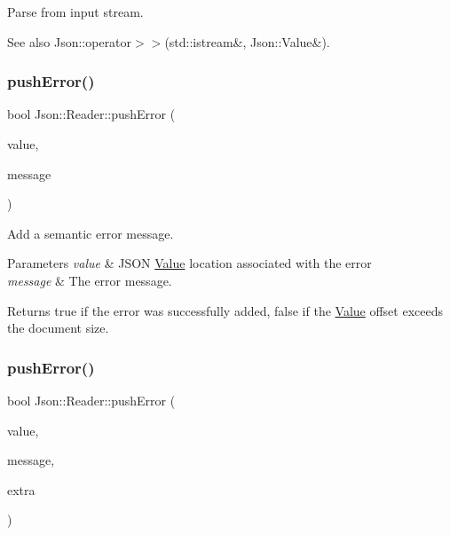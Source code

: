 Parse from input stream. 

\begin{DoxySeeAlso}{See also}
Json\+::operator$>$$>$(std\+::istream\&, Json\+::\+Value\&). 
\end{DoxySeeAlso}
\mbox{\label{classJson_1_1Reader_af5fa7099083f01706635ade1d0f8ddb5}} 
\subsubsection{\texorpdfstring{push\+Error()}{pushError()}\hspace{0.1cm}{\footnotesize\ttfamily [1/2]}}
{\footnotesize\ttfamily bool Json\+::\+Reader\+::push\+Error (\begin{DoxyParamCaption}\item[{const \hyperlink{classJson_1_1Value}{Value} \&}]{value,  }\item[{const J\+S\+O\+N\+C\+P\+P\+\_\+\+S\+T\+R\+I\+NG \&}]{message }\end{DoxyParamCaption})}



Add a semantic error message. 


\begin{DoxyParams}{Parameters}
{\em value} & J\+S\+ON \hyperlink{classJson_1_1Value}{Value} location associated with the error \\
\hline
{\em message} & The error message. \\
\hline
\end{DoxyParams}
\begin{DoxyReturn}{Returns}
{\ttfamily true} if the error was successfully added, {\ttfamily false} if the \hyperlink{classJson_1_1Value}{Value} offset exceeds the document size. 
\end{DoxyReturn}
\mbox{\label{classJson_1_1Reader_a3568be9db568ff57bd3fcc373143dff3}} 
\subsubsection{\texorpdfstring{push\+Error()}{pushError()}\hspace{0.1cm}{\footnotesize\ttfamily [2/2]}}
{\footnotesize\ttfamily bool Json\+::\+Reader\+::push\+Error (\begin{DoxyParamCaption}\item[{const \hyperlink{classJson_1_1Value}{Value} \&}]{value,  }\item[{const J\+S\+O\+N\+C\+P\+P\+\_\+\+S\+T\+R\+I\+NG \&}]{message,  }\item[{const \hyperlink{classJson_1_1Value}{Value} \&}]{extra }\end{DoxyParamCaption})}



